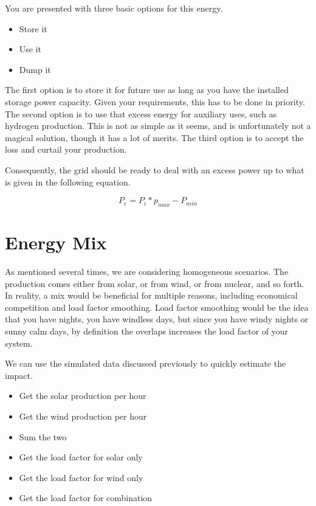 You are presented with three basic options for this energy.
\begin{itemize}
\item Store it
\item Use it
\item Dump it
\end{itemize}

The first option is to store it for future use as long as you have the installed storage power capacity. Given your requirements, this has to be done in priority. The second option is to use that excess energy for auxiliary uses, such as hydrogen production. This is not as simple as it seems, and is unfortunately not a magical solution, though it has a lot of merits. The third option is to accept the loss and curtail your production.


\begin{remark}
Consequently, the grid should be ready to deal with an excess power up to what is given in the following equation.

\begin{equation}\label{excess_power}
P_e = P_i * p_{max} - P_{min}
\end{equation}
\end{remark}


\section{Energy Mix}

As mentioned several times, we are considering homogeneous scenarios. The production comes either from solar, or from wind, or from nuclear, and so forth. In reality, a mix would be beneficial for multiple reasons, including economical competition and load factor smoothing. Load factor smoothing would be the idea that you have nights, you have windless days, but since you have windy nights or sunny calm days, by definition the overlaps increases the load factor of your system.

We can use the simulated data discussed previously to quickly estimate the impact.

\begin{itemize}
\item Get the solar production per hour
\item Get the wind production per hour
\item Sum the two
\item Get the load factor for solar only
\item Get the load factor for wind only
\item Get the load factor for combination
\end{itemize}



